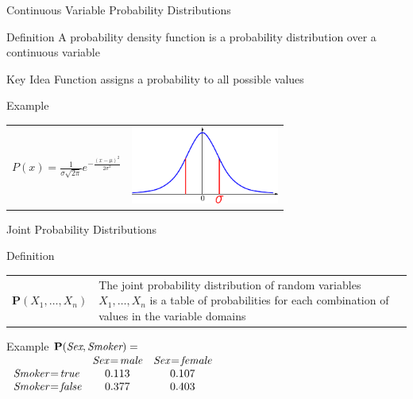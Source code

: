 \documentclass[12pt]{beamer}
\newcommand{\EM}[1]{\mbox{\em#1}}
\newcommand{\tab}{\hspace{1em}}
\begin{document}
\begin{frame}{Continuous Variable Probability Distributions}
	\begin{block}{Definition}
		A \alert{probability density function} is a probability distribution over a continuous variable
	\end{block}
	\begin{block}{Key Idea}
		Function assigns a probability to all possible values
	\end{block}
	\pause
	\begin{block}{Example}
		\begin{tabular}{lr}
			\large $P(x) = \frac{1}{\sigma\sqrt{2\pi}}e^{-\frac{(x - \mu)^{2}}{2\sigma^{2}}}$ 
			&
			\parbox{2in}{\includegraphics[height=1in]{gaussian-density}}
		\end{tabular}
	\end{block}
\end{frame}
\begin{frame}{Joint Probability Distributions}
	\begin{block}{Definition}
		\begin{tabular}{@{}lm{2.85in}@{}}
			\large $\mathbf{P}(X_1, \ldots, X_n)$
			&
			The \alert{joint probability distribution} of random variables $X_1, \ldots, X_n$ is a table of probabilities for each combination of values in the variable domains
		\end{tabular}
	\end{block}
	\pause
	\begin{block}{Example}
		$\mathbf{P}(\EM{Sex},\EM{Smoker}) = \mbox{}$ \\[.25em]
		\tab
		$
		\begin{array}{lcc}
			                           & \EM{Sex}\!=\!\EM{male} & \EM{Sex}\!=\!\EM{female} \\
			\EM{Smoker}\!=\!\EM{true}  & 0.113                  & 0.107 \\
			\EM{Smoker}\!=\!\EM{false} & 0.377                  & 0.403 \\
		\end{array}
		$
	\end{block}
\end{frame}
\end{document}
